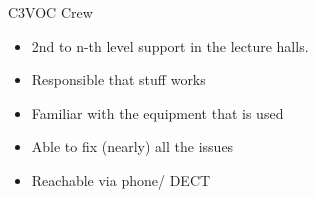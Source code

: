 
\begin{frame}{C3VOC Crew}
	\begin{itemize}
		\item 2nd to n-th level support in the lecture halls.
		\item Responsible that stuff works
		\item Familiar with the equipment that is used
		\item Able to fix (nearly) all the issues
		\item Reachable via phone/ DECT
	\end{itemize}
\end{frame}
